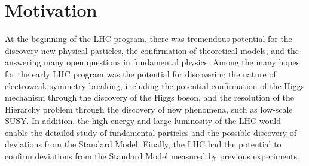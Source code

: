 
%
\section{Motivation}




At the beginning of the LHC program, there was tremendous potential for the discovery new physical particles, the confirmation of theoretical models,
and the answering many open questions in fundamental physics.
Among the many hopes for the early LHC program was the potential for discovering the nature of electroweak symmetry breaking,
including the potential confirmation of the Higgs mechanism through the discovery of the Higgs boson, and the resolution of the Hierarchy problem
through the discovery of new phenomena, such as low-scale SUSY.
In addition, the high energy and large luminosity of the LHC would enable the detailed study of fundamental particles and the possible discovery of deviations from the Standard Model.
Finally, the LHC had the potential to confirm deviations from the Standard Model measured by previous experiments.


